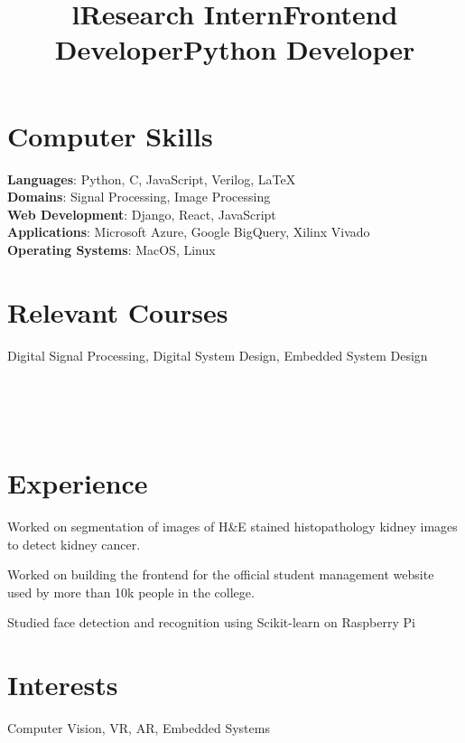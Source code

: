 \documentclass[margin]{res}
\begin{document}
\begin{resume}
    \section{Computer Skills}
      \textbf{Languages}: Python, C, JavaScript, Verilog, \LaTeX
      \\
      \textbf{Domains}: Signal Processing, Image Processing
      \\
      \textbf{Web Development}: Django, React, JavaScript
      \\
      \textbf{Applications}: Microsoft Azure, Google BigQuery, Xilinx Vivado
      \\
      \textbf{Operating Systems}: MacOS, Linux

    \section{Relevant Courses}
      Digital Signal Processing, Digital System Design, Embedded System Design

    \begin{format}
      \title{l}\\
      \\
      \body\\
    \end{format}

    \section{Experience}
      \title{\textbf{Research Intern}}
      \begin{position}
        Worked on segmentation of images of H\&E stained histopathology kidney images to detect kidney cancer.
      \end{position}

      \title{\textbf{Frontend Developer}}
      \begin{position}
        Worked on building the frontend for the official student management website used by more than 10k people in the college.
      \end{position}

      \title{\textbf{Python Developer}}
      \begin{position}
        Studied face detection and recognition using Scikit-learn on Raspberry Pi
      \end{position}

    \section{Interests}
      Computer Vision, VR, AR, Embedded Systems
  \end{resume}
\end{document}
